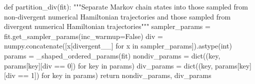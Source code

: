 \documentclass[
  letterpaper,
  DIV=11,
  numbers=noendperiod]{scrartcl}
\newenvironment{Shaded}{\begin{snugshade}}{\end{snugshade}}
\newcommand{\BuiltInTok}[1]{\textcolor[rgb]{0.00,0.23,0.31}{#1}}
\newcommand{\CommentTok}[1]{\textcolor[rgb]{0.37,0.37,0.37}{#1}}
\newcommand{\ControlFlowTok}[1]{\textcolor[rgb]{0.00,0.23,0.31}{#1}}
\newcommand{\DecValTok}[1]{\textcolor[rgb]{0.68,0.00,0.00}{#1}}
\newcommand{\KeywordTok}[1]{\textcolor[rgb]{0.00,0.23,0.31}{#1}}
\newcommand{\NormalTok}[1]{\textcolor[rgb]{0.00,0.23,0.31}{#1}}
\newcommand{\OperatorTok}[1]{\textcolor[rgb]{0.37,0.37,0.37}{#1}}
\newcommand{\StringTok}[1]{\textcolor[rgb]{0.13,0.47,0.30}{#1}}
\newcommand{\VariableTok}[1]{\textcolor[rgb]{0.07,0.07,0.07}{#1}}
\begin{document}
\begin{Shaded}
\begin{Highlighting}[]
\KeywordTok{def}\NormalTok{ partition\_div(fit):}
  \CommentTok{"""Separate Markov chain states into those sampled from non{-}divergent}
\CommentTok{     numerical Hamiltonian trajectories and those sampled from divergent}
\CommentTok{     numerical Hamiltonian trajectories"""}
\NormalTok{  sampler\_params }\OperatorTok{=}\NormalTok{ fit.get\_sampler\_params(inc\_warmup}\OperatorTok{=}\VariableTok{False}\NormalTok{)}
\NormalTok{  div }\OperatorTok{=}\NormalTok{ numpy.concatenate([x[}\StringTok{\textquotesingle{}divergent\_\_\textquotesingle{}}\NormalTok{] }\ControlFlowTok{for}\NormalTok{ x }\KeywordTok{in}
\NormalTok{                           sampler\_params]).astype(}\StringTok{\textquotesingle{}int\textquotesingle{}}\NormalTok{)}
\NormalTok{  params }\OperatorTok{=}\NormalTok{ \_shaped\_ordered\_params(fit)}
\NormalTok{  nondiv\_params }\OperatorTok{=} \BuiltInTok{dict}\NormalTok{((key, params[key][div }\OperatorTok{==} \DecValTok{0}\NormalTok{]) }\ControlFlowTok{for}\NormalTok{ key }\KeywordTok{in}\NormalTok{ params)}
\NormalTok{  div\_params }\OperatorTok{=} \BuiltInTok{dict}\NormalTok{((key, params[key][div }\OperatorTok{==} \DecValTok{1}\NormalTok{]) }\ControlFlowTok{for}\NormalTok{ key }\KeywordTok{in}\NormalTok{ params)}
  \ControlFlowTok{return}\NormalTok{ nondiv\_params, div\_params}
\end{Highlighting}
\end{Shaded}
\end{document}
